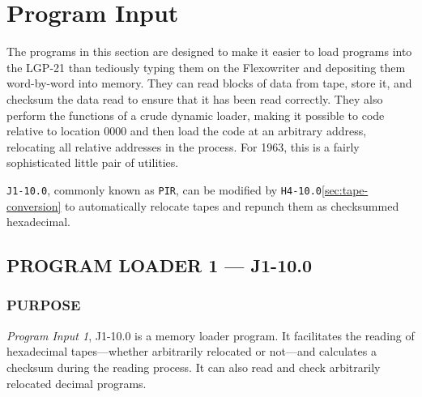 
\section{Program Input}
\label{sec:program-loaders}
The programs in this section are designed to make it easier to load programs into the LGP-21 than tediously typing them on the Flexowriter and depositing them word-by-word into memory. They can read blocks of data from tape, store it, and checksum the data read to ensure that it has been read correctly. They also perform the functions of a crude dynamic loader, making it possible to code relative to location 0000 and then load the code at an arbitrary address, relocating all relative addresses in the process. For 1963, this is a fairly sophisticated little pair of utilities.

\texttt{J1-10.0}, commonly known as \texttt{PIR}, can be modified by \texttt{H4-10.0}\ref{sec:tape-conversion} to automatically relocate tapes and repunch them as checksummed hexadecimal.

\subsection*{PROGRAM LOADER 1 --- J1-10.0}
\label{sec:PIRloader}

\subsubsection*{PURPOSE}

\emph{Program Input 1}, J1-10.0 is a memory loader program. It facilitates the reading of hexadecimal tapes—whether arbitrarily relocated or not—and calculates a checksum during the reading process. It can also read and check arbitrarily relocated decimal programs.

